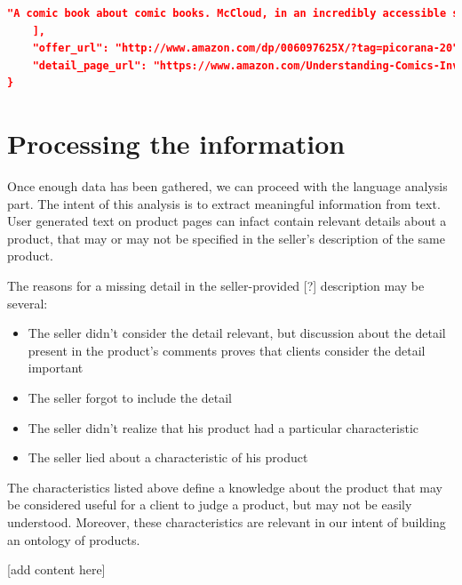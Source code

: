 \documentclass[LaM,binding=0.6cm]{sapthesis}
\begin{document}
\begin{lstlisting}[language=json,firstnumber=1]
        "A comic book about comic books. McCloud, in an incredibly accessible style, explains the details of how comics work: how they're composed, read and understood. More than just a book about comics, this gets to the heart of how we deal with visual languages in general. \"The potential of comics is limitless and exciting!\" writes McCloud. This should be required reading for every school teacher. Pulitzer Prize-winner Art Spiegelman says, \"The most intelligent comics I've seen in a long time.\""
    ], 
    "offer_url": "http://www.amazon.com/dp/006097625X/?tag=picorana-20", 
    "detail_page_url": "https://www.amazon.com/Understanding-Comics-Invisible-Scott-McCloud/dp/006097625X?SubscriptionId=AKIAIRCSTDTCOYE3OA6Q&tag=picorana-20&linkCode=xm2&camp=2025&creative=165953&creativeASIN=006097625X"
}
\end{lstlisting}


\chapter{Processing the information}

Once enough data has been gathered, we can proceed with the language analysis part.
The intent of this analysis is to extract meaningful information from text. User generated text on product pages can infact contain relevant details about a product, that may or may not be specified in the seller's description of the same product. 

The reasons for a missing detail in the seller-provided [?] description may be several:
\begin{itemize}
	\item The seller didn't consider the detail relevant, but discussion about the detail present in the product's comments proves that clients consider the detail important
	\item The seller forgot to include the detail
	\item The seller didn't realize that his product had a particular characteristic
	\item The seller lied about a characteristic of his product
\end{itemize}

The characteristics listed above define a knowledge about the product that may be considered useful for a client to judge a product, but may not be easily understood. Moreover, these characteristics are relevant in our intent of building an ontology of products.

[add content here]
\end{document}
